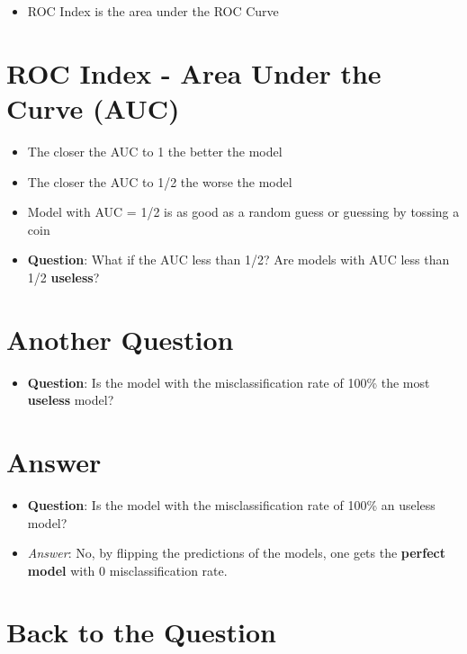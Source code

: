 \documentclass[
]{article}
\providecommand{\tightlist}{%
  \setlength{\itemsep}{0pt}\setlength{\parskip}{0pt}}
\begin{document}
\begin{itemize}
\tightlist
\item
  ROC Index is the area under the ROC Curve
\end{itemize}

\hypertarget{roc-index---area-under-the-curve-auc}{%
\section{ROC Index - Area Under the Curve
(AUC)}\label{roc-index---area-under-the-curve-auc}}

\begin{itemize}
\item
  The closer the AUC to 1 the better the model
\item
  The closer the AUC to 1/2 the worse the model
\item
  Model with AUC = 1/2 is as good as a random guess or guessing by
  tossing a coin
\item
  \textbf{Question}: What if the AUC less than 1/2? Are models with AUC
  less than 1/2 \textbf{useless}?
\end{itemize}

\hypertarget{another-question}{%
\section{Another Question}\label{another-question}}

\begin{itemize}
\tightlist
\item
  \textbf{Question}: Is the model with the misclassification rate of
  100\% the most \textbf{useless} model?
\end{itemize}

\hypertarget{answer}{%
\section{Answer}\label{answer}}

\begin{itemize}
\tightlist
\item
  \textbf{Question}: Is the model with the misclassification rate of
  100\% an useless model?
\item
  \emph{Answer}: No, by flipping the predictions of the models, one gets
  the \textbf{perfect model} with 0 misclassification rate.
\end{itemize}

\hypertarget{back-to-the-question}{%
\section{Back to the Question}\label{back-to-the-question}}
\end{document}
